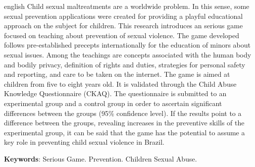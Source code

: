 
\begin{resumo}[Abstract]
 \begin{otherlanguage*}{english}
  Child sexual maltreatments are a worldwide problem. In this sense, some sexual prevention applications were created for providing a playful educational approach on the subject for children. This research introduces an serious game focused on teaching about prevention of sexual violence. The game developed follows pre-established precepts internationally for the education of minors about sexual issues. Among the teachings are concepts associated with the human body and bodily privacy, definition of rights and duties, strategies for personal safety and reporting, and care to be taken on the internet. The game is aimed at children from five to eight years old. It is validated through the Child Abuse Knowledge Questionnaire (CKAQ). The questionnaire is submitted to an experimental group and a control group in order to ascertain significant differences between the groups (95\% confidence level). If the results point to a difference between the groups, revealing increases in the preventive skills of the experimental group, it can be said that the game has the potential to assume a key role in preventing child sexual violence in Brazil.
  
   \textbf{Keywords}: Serious Game. Prevention. Children Sexual Abuse.
 \end{otherlanguage*}
\end{resumo}
